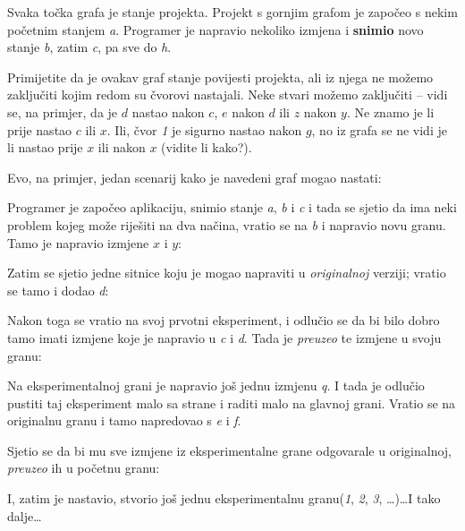 

Svaka točka grafa je stanje projekta. 
Projekt s gornjim grafom je započeo s nekim početnim stanjem \emph a.
Programer je napravio nekoliko izmjena i \textbf{snimio} novo stanje \emph b, zatim \emph c, pa sve do \emph h.

Primijetite da je ovakav graf stanje povijesti projekta, ali iz njega ne možemo zaključiti kojim redom su čvorovi nastajali.
Neke stvari možemo zaključiti -- vidi se, na primjer, da je $d$ nastao nakon $c$, $e$ nakon $d$ ili $z$ nakon $y$.
Ne znamo je li prije nastao $c$ ili $x$.
Ili, čvor \emph 1 je sigurno nastao nakon $g$, no iz grafa se ne vidi je li nastao prije $x$ ili nakon $x$ (vidite li kako?).

Evo, na primjer, jedan scenarij kako je navedeni graf mogao nastati:



Programer je započeo aplikaciju, snimio stanje \emph a, \emph b i \emph c i tada se sjetio da ima neki problem kojeg može riješiti na dva načina, vratio se na \emph b i napravio novu granu. Tamo je napravio izmjene $x$ i $y$:



Zatim se sjetio jedne sitnice koju je mogao napraviti u \emph{originalnoj} verziji; vratio se tamo i dodao \emph d:



Nakon toga se vratio na svoj prvotni eksperiment, i odlučio se da bi bilo dobro tamo imati izmjene koje je napravio u \emph c i \emph d.
Tada je \emph{preuzeo} te izmjene u svoju granu:



Na eksperimentalnoj grani je napravio još jednu izmjenu \emph q.
I tada je odlučio pustiti taj eksperiment malo sa strane i raditi malo na glavnoj grani.
Vratio se na originalnu granu i tamo napredovao s \emph e i \emph f. 



Sjetio se da bi mu sve izmjene iz eksperimentalne grane odgovarale u originalnoj, \emph{preuzeo} ih u početnu granu:



I, zatim je nastavio, stvorio još jednu eksperimentalnu granu(\emph 1, \emph 2, \emph 3, \dots)\dots I tako dalje\dots

